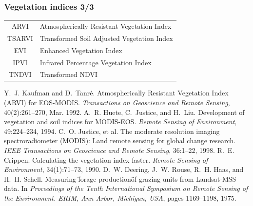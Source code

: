 \documentclass[compress]{beamer}
\begin{document}
\begin{frame}
\frametitle{Vegetation indices 3/3}
\footnotesize \centering
\begin{tabular}{|c|l|}
\hline
ARVI & Atmospherically Resistant  Vegetation Index \cite{ARVI} \\
TSARVI & Transformed Soil Adjusted Vegetation Index   \cite{ARVI} \\
EVI & Enhanced Vegetation Index \cite{Huete1994-EVI,Justice1998-EVI} \\
IPVI & Infrared Percentage Vegetation Index  \cite{Crippen1990-IPVI} \\
TNDVI & Transformed NDVI  \cite{Deering1975-TNDVI} \\
\hline
\end{tabular}
\begin{thebibliography}{noidea}
\tiny
{}
Y.~J. Kaufman and D.~Tanr\'e.
 {Atmospherically Resistant Vegetation Index (ARVI) for EOS-MODIS}.
 {\em Transactions on Geoscience and Remote Sensing}, 40(2):261--270,
  Mar. 1992.
A.~R. Huete, C.~Justice, and H.~Liu.
 Development of vegetation and soil indices for {MODIS-EOS}.
 {\em Remote Sensing of Environment}, 49:224--234, 1994.
C.~O. Justice, et al.
 The moderate resolution imaging spectroradiometer ({MODIS}): Land
  remote sensing for global change research.
 {\em IEEE Transactions on Geoscience and Remote Sensing}, 36:1--22,
  1998.
R.~E. Crippen.
 Calculating the vegetation index faster.
 {\em Remote Sensing of Environment}, 34(1):71--73, 1990.
D.~W. Deering, J.~W. Rouse, R.~H. Haas, and H.~H. Schell.
 Measuring \"forage production\" of grazing units from {L}andsat-{MSS}
  data.
 In {\em Proceedings of the Tenth International Symposium on Remote
  Sensing of the Environment. ERIM, Ann Arbor, Michigan, USA}, pages
  1169--1198, 1975.
\end{thebibliography}
\end{frame}
\end{document}
